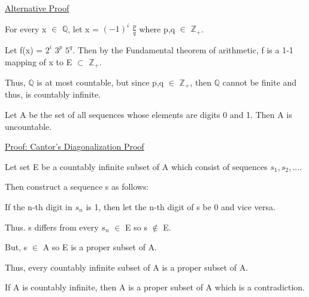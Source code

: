 	{ \color{magenta} \underline{Alternative Proof} }

	\begin{tbox}
		For every x $\in$ $\mathbb{Q}$, let x = $(-1)^i$ $\frac{p}{q}$ where
		p,q $\in$ $\mathbb{Z}_+$.

		Let f(x) = $2^i$ $3^p$ $5^q$. Then by the Fundamental theorem of arithmetic,
		f is a 1-1 mapping of x to E $\subset$ $\mathbb{Z}_+$.

		Thus, $\mathbb{Q}$ is at most countable, but since p,q $\in$ $\mathbb{Z}_+$,
		then $\mathbb{Q}$ cannot be finite and thus, is countably infinite. 
	\end{tbox}
	
	\vspace{0.5cm}


	 
	\begin{example}
		Let A be the set of all sequences whose elements are digits 0 and 1.
		Then A is uncountable. 
	\end{example}

	\vspace{0.1cm}
	 
	{ \color{magenta} \underline{Proof: Cantor's Diagonalization Proof} }
	 
	\begin{tbox}
		Let set E be a countably infinite subset of A which consist of
		sequences $s_1,s_2,...$.

		Then construct a sequence s as follows:

		\qquad If the n-th digit in $s_n$ is 1, then let the n-th digit of s be 0
		and vice versa.

		Thus. s differs from every $s_n$ $\in$ E so s $\not \in$ E.

		But, s $\in$ A so E is a proper subset of A.

		Thus, every countably infinite subset of A is a proper subset of A.

		If A is countably infinite, then A is a proper subset of A which
		is a contradiction.
	\end{tbox}
	



	